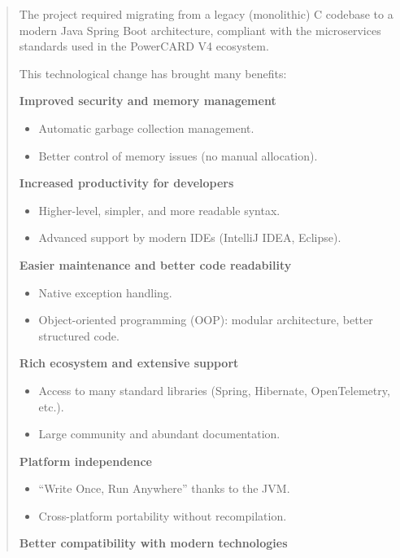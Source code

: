 \documentclass[12pt,a4paper]{report}
\begin{document}
\begin{quote}
The project required migrating from a legacy (monolithic) C codebase to
a modern Java Spring Boot architecture, compliant with the microservices
standards used in the PowerCARD V4 ecosystem.

This technological change has brought many benefits:

\textbf{Improved security and memory management}


\begin{itemize}
\item Automatic garbage collection management.
\item Better control of memory issues (no manual allocation).
\end{itemize}

\textbf{Increased productivity for developers}

\begin{itemize}
\item Higher-level, simpler, and more readable syntax.
\item Advanced support by modern IDEs (IntelliJ IDEA, Eclipse).
\end{itemize}

\textbf{Easier maintenance and better code readability}

\begin{itemize}
\item Native exception handling.
\item Object-oriented programming (OOP): modular architecture, better structured code.
\end{itemize}

\textbf{Rich ecosystem and extensive support}

\begin{itemize}
\item Access to many standard libraries (Spring, Hibernate, OpenTelemetry, etc.).
\item Large community and abundant documentation.
\end{itemize}

\textbf{Platform independence}

\begin{itemize}
\item ``Write Once, Run Anywhere'' thanks to the JVM.
\item Cross-platform portability without recompilation.
\end{itemize}

\textbf{Better compatibility with modern technologies}


\end{quote}
\end{document}
